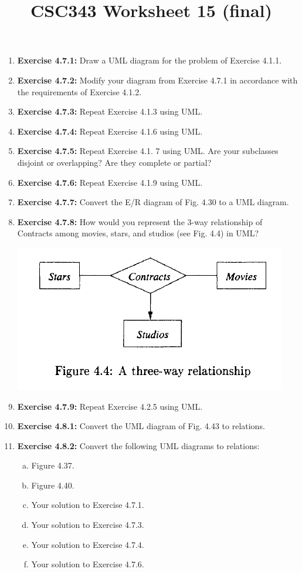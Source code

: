 \documentclass[12pt]{article}
\begin{document}
\title{CSC343 Worksheet 15 (final)}
\maketitle

\begin{enumerate}[1.]
    \item \textbf{Exercise 4.7.1:} Draw a UML diagram for the problem of Exercise 4.1.1.
    \item \textbf{Exercise 4.7.2:} Modify your diagram from Exercise 4.7.1 in accordance with the requirements of Exercise 4.1.2.
    \item \textbf{Exercise 4.7.3:} Repeat Exercise 4.1.3 using UML.
    \item \textbf{Exercise 4.7.4:} Repeat Exercise 4.1.6 using UML.
    \item \textbf{Exercise 4.7.5:} Repeat Exercise 4.1. 7 using UML. Are your subclasses disjoint or overlapping? Are they complete or partial?
    \item \textbf{Exercise 4.7.6:} Repeat Exercise 4.1.9 using UML.
    \item \textbf{Exercise 4.7.7:} Convert the E/R diagram of Fig. 4.30 to a UML diagram.
    \item \textbf{Exercise 4.7.8:} How would you represent the 3-way relationship of Contracts among movies, stars, and studios (see Fig. 4.4) in UML?

    \begin{center}
    \includegraphics[width=0.6\linewidth]{images/worksheet_15_1.png}
    \end{center}

    \item \textbf{Exercise 4.7.9:} Repeat Exercise 4.2.5 using UML.
    \item \textbf{Exercise 4.8.1:} Convert the UML diagram of Fig. 4.43 to relations.
    \item \textbf{Exercise 4.8.2:} Convert the following UML diagrams to relations:

    \begin{enumerate}[a)]
        \item Figure 4.37.
        \item Figure 4.40.
        \item Your solution to Exercise 4.7.1.
        \item Your solution to Exercise 4.7.3.
        \item Your solution to Exercise 4.7.4.
        \item Your solution to Exercise 4.7.6.
    \end{enumerate}


\end{enumerate}
\end{document}
